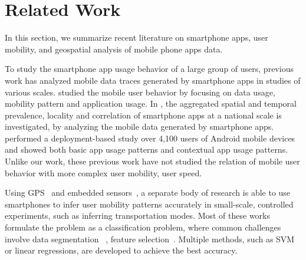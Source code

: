 \section{Related Work}\label{relate}


In this section, we summarize recent literature on smartphone apps, user mobility, and geospatial analysis of mobile phone apps data.



To study the smartphone app usage behavior of a large group of users, previous work has analyzed mobile data traces generated by smartphone apps in studies of various scales. \cite{yang2015characterizing} studied the mobile user behavior by focusing on data usage, mobility pattern and application usage. In \cite{xu2011identifying}, the aggregated spatial and temporal prevalence, locality and correlation of smartphone apps at a national scale is investigated, by analyzing the mobile data generated by smartphone apps. \cite{bohmer2011falling} performed a deployment-based study over 4,100 users of Android mobile devices and showed both basic app usage patterns and contextual app usage patterns. Unlike our work, these previous work have not studied the relation of mobile user behavior with more complex user mobility, \ie user speed.


Using GPS~\cite{ohashi2014automatic, ryder2009ambulation, zheng2010understanding, biljecki2013transportation, stenneth2011transportation, waga2012detecting, widhalm2012transport, Reddy:2010:UMP:1689239.1689243}
and embedded sensors~\cite{Hemminki:2013:ATM:2517351.2517367, wang2010accelerometer, shin2015urban, manzoni2010transportation, tacconi2011smartphone, Reddy:2010:UMP:1689239.1689243, ohashi2014automatic}, a separate body of research is able to use smartphones to infer user mobility patterns accurately in small-scale, controlled experiments, such as inferring transportation modes. Most of these works formulate the problem as a classification problem, where common challenges involve data segmentation ~\cite{ohashi2014automatic,waga2012detecting, zheng2010understanding, biljecki2013transportation}, feature selection~\cite{zheng2010understanding, biljecki2013transportation, wang2010accelerometer, stenneth2011transportation}. Multiple methods, such as SVM or linear regressions, are developed to achieve the best accuracy. 

